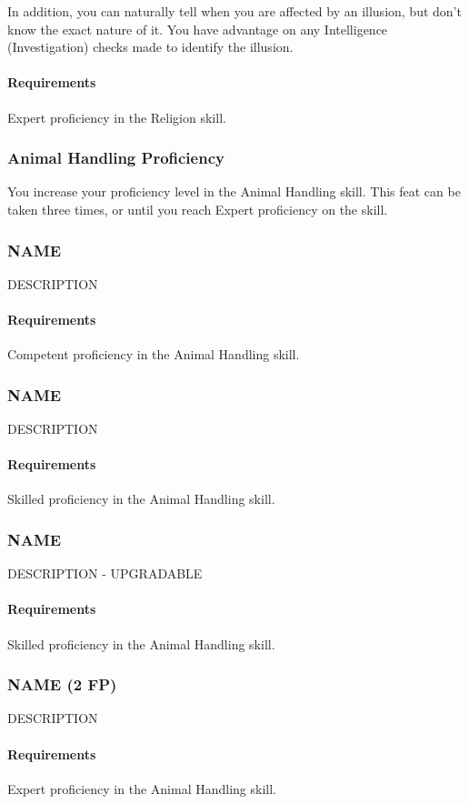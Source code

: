     In addition, you can naturally tell when you are affected by an illusion, but don't know the exact nature of it.
    You have advantage on any Intelligence (Investigation) checks made to identify the illusion.
    \paragraph{Requirements} Expert proficiency in the Religion skill.
\subsubsection{Animal Handling Proficiency} \label{feat::animalhandlingprof}
    You increase your proficiency level in the Animal Handling skill.
    This feat can be taken three times, or until you reach Expert proficiency on the skill.
\subsubsection{NAME} \label{feat::name}
    DESCRIPTION
    \paragraph{Requirements} Competent proficiency in the Animal Handling skill.
\subsubsection{NAME} \label{feat::name}
    DESCRIPTION
    \paragraph{Requirements} Skilled proficiency in the Animal Handling skill.
\subsubsection{NAME} \label{feat::name}
    DESCRIPTION - UPGRADABLE
    \paragraph{Requirements} Skilled proficiency in the Animal Handling skill.
\subsubsection{NAME (2 FP)} \label{feat::name}
    DESCRIPTION
    \paragraph{Requirements} Expert proficiency in the Animal Handling skill.
